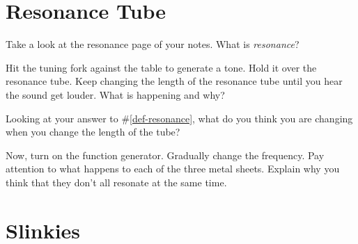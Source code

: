 \documentclass[10pt]{exam}
\begin{document}
\pagebreak

\section{Resonance Tube}

\begin{questions}
  \question \label{def-resonance}
    Take a look at the resonance page of your notes.  What is \emph{resonance}? \vs

  \question
    Hit the tuning fork against the table to generate a tone.  Hold it over the resonance tube.  Keep changing the length of the resonance tube until you hear the sound get louder.  What is happening and why? \vs

  \question
    Looking at your answer to \#\ref{def-resonance}, what do you think you are changing when you change the length of the tube? \vs

  \question
    Now, turn on the function generator.  Gradually change the frequency.  Pay attention to what happens to each of the three metal sheets.  Explain why you think that they don't all resonate at the same time. \vs
    
\end{questions}


\section{Slinkies}
\end{document}
